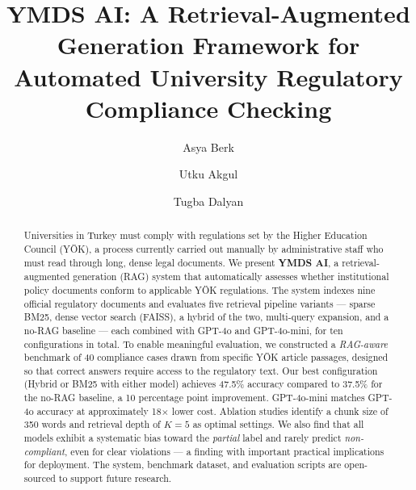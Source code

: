 \documentclass[a4paper,fleqn]{cas-dc}
\begin{document}
\let\WriteBookmarks\relax
\def\floatpagepagefraction{1}
\def\textpagefraction{.001}

\title[mode=title]{YMDS AI: A Retrieval-Augmented Generation Framework
  for Automated University Regulatory Compliance Checking}

\author[1]{Asya Berk}

\author[1]{Utku Akgul}

\author[1]{Tugba Dalyan}
\cormark[1]
\fnmark[1]



\begin{abstract}
Universities in Turkey must comply with regulations set by the Higher Education Council
(YÖK), a process currently carried out manually by administrative staff who must read
through long, dense legal documents. We present \textbf{YMDS AI}, a
retrieval-augmented generation (RAG) system that automatically assesses whether
institutional policy documents conform to applicable YÖK regulations. The system indexes
nine official regulatory documents and evaluates five retrieval pipeline variants ---
sparse BM25, dense vector search (FAISS), a hybrid of the two, multi-query expansion,
and a no-RAG baseline --- each combined with GPT-4o and GPT-4o-mini, for ten
configurations in total. To enable meaningful evaluation, we constructed a
\textit{RAG-aware} benchmark of 40 compliance cases drawn from specific YÖK article
passages, designed so that correct answers require access to the regulatory text. Our
best configuration (Hybrid or BM25 with either model) achieves 47.5\% accuracy compared
to 37.5\% for the no-RAG baseline, a 10 percentage point improvement. GPT-4o-mini
matches GPT-4o accuracy at approximately 18$\times$ lower cost. Ablation studies
identify a chunk size of 350 words and retrieval depth of $K{=}5$ as optimal settings.
We also find that all models exhibit a systematic bias toward the \textit{partial} label
and rarely predict \textit{non-compliant}, even for clear violations --- a finding with
important practical implications for deployment. The system, benchmark dataset, and
evaluation scripts are open-sourced to support future research.
\end{abstract}
\end{document}
